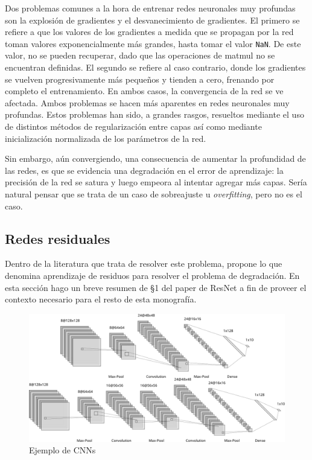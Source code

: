 \documentclass[titlepage,a4paper,oneside]{article}
\begin{document}
Dos problemas comunes a la hora de entrenar redes neuronales muy profundas son la explosión de gradientes y el desvanecimiento de gradientes. El primero se refiere a que los valores de los gradientes a medida que se propagan por la red toman valores exponencialmente más grandes, hasta tomar el valor \texttt{NaN}. De este valor, no se pueden recuperar, dado que las operaciones de matmul no se encuentran definidas. El segundo se refiere al caso contrario, donde los gradientes se vuelven progresivamente más pequeños y tienden a cero, frenando por completo el entrenamiento. En ambos casos, la convergencia de la red se ve afectada. Ambos problemas se hacen más aparentes en redes neuronales muy profundas. Estos problemas han sido, a grandes rasgos, resueltos mediante el uso de distintos métodos de regularización entre capas así como mediante inicialización normalizada de los parámetros de la red.

Sin embargo, aún convergiendo, una consecuencia de aumentar la profundidad de las redes, es que se evidencia una degradación en el error de aprendizaje: la precisión de la red se satura y luego empeora al intentar agregar más capas. Sería natural pensar que se trata de un caso de sobreajuste u \textit{overfitting}, pero no es el caso.


\subsection{Redes residuales}
Dentro de la literatura que trata de resolver este problema, \cite{DBLP:journals/corr/HeZRS15} propone lo que denomina aprendizaje de residuos para resolver el problema de degradación. En esta sección hago un breve resumen de \S 1 del paper de ResNet a fin de proveer el contexto necesario para el resto de esta monografía.

\begin{figure}[H]
\centering
\includegraphics[width=\textwidth]{images/ex_cnns.png}
\caption{Ejemplo de CNNs}
\label{ex_cnn}
\end{figure}
\end{document}
